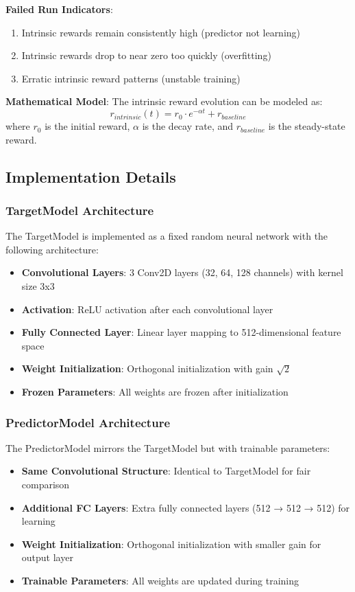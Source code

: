 \documentclass[12pt]{article}
\begin{document}
{{{\textbf{Failed Run Indicators}:
\begin{enumerate}
    \item Intrinsic rewards remain consistently high (predictor not learning)
    \item Intrinsic rewards drop to near zero too quickly (overfitting)
    \item Erratic intrinsic reward patterns (unstable training)
\end{enumerate}

\textbf{Mathematical Model}: The intrinsic reward evolution can be modeled as:
\begin{equation}
r_{intrinsic}(t) = r_0 \cdot e^{-\alpha t} + r_{baseline}
\end{equation}
where $r_0$ is the initial reward, $\alpha$ is the decay rate, and $r_{baseline}$ is the steady-state reward.

\subsection{Implementation Details}

\subsubsection{TargetModel Architecture}
The TargetModel is implemented as a fixed random neural network with the following architecture:
\begin{itemize}
    \item \textbf{Convolutional Layers}: 3 Conv2D layers (32, 64, 128 channels) with kernel size 3x3
    \item \textbf{Activation}: ReLU activation after each convolutional layer
    \item \textbf{Fully Connected Layer}: Linear layer mapping to 512-dimensional feature space
    \item \textbf{Weight Initialization}: Orthogonal initialization with gain $\sqrt{2}$
    \item \textbf{Frozen Parameters}: All weights are frozen after initialization
\end{itemize}

\subsubsection{PredictorModel Architecture}
The PredictorModel mirrors the TargetModel but with trainable parameters:
\begin{itemize}
    \item \textbf{Same Convolutional Structure}: Identical to TargetModel for fair comparison
    \item \textbf{Additional FC Layers}: Extra fully connected layers (512 → 512 → 512) for learning
    \item \textbf{Weight Initialization}: Orthogonal initialization with smaller gain for output layer
    \item \textbf{Trainable Parameters}: All weights are updated during training
\end{itemize}

}}}
\end{document}
